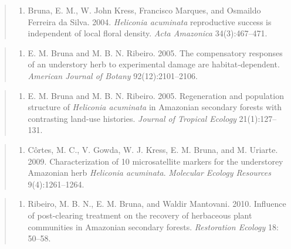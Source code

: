 \documentclass[
  12pt,
  man, donotrepeattitle,floatsintext]{apa6}
\providecommand{\tightlist}{%
  \setlength{\itemsep}{0pt}\setlength{\parskip}{0pt}}
\begin{document}
\begin{quote}
\begin{enumerate}
\def\labelenumi{\arabic{enumi}.}
\setcounter{enumi}{1}
\tightlist
\item
  Bruna, E. M., W. John Kress, Francisco Marques, and Osmaildo Ferreira da Silva. 2004. \emph{Heliconia acuminata} reproductive success is independent of local floral density. \emph{Acta Amazonica} 34(3):467--471.
\end{enumerate}
\end{quote}

\begin{quote}
\begin{enumerate}
\def\labelenumi{\arabic{enumi}.}
\setcounter{enumi}{2}
\tightlist
\item
  E. M. Bruna and M. B. N. Ribeiro. 2005. The compensatory responses of an understory herb to experimental damage are habitat‐dependent. \emph{American Journal of Botany} 92(12):2101--2106.
\end{enumerate}
\end{quote}

\begin{quote}
\begin{enumerate}
\def\labelenumi{\arabic{enumi}.}
\setcounter{enumi}{3}
\tightlist
\item
  E. M. Bruna and M. B. N. Ribeiro. 2005. Regeneration and population structure of \emph{Heliconia acuminata} in Amazonian secondary forests with contrasting land-use histories. \emph{Journal of Tropical Ecology} 21(1):127--131.
\end{enumerate}
\end{quote}

\begin{quote}
\begin{enumerate}
\def\labelenumi{\arabic{enumi}.}
\setcounter{enumi}{4}
\tightlist
\item
  Côrtes, M. C., V. Gowda, W. J. Kress, E. M. Bruna, and M. Uriarte. 2009. Characterization of 10 microsatellite markers for the understorey Amazonian herb \emph{Heliconia acuminata}. \emph{Molecular Ecology Resources} 9(4):1261--1264.
\end{enumerate}
\end{quote}

\begin{quote}
\begin{enumerate}
\def\labelenumi{\arabic{enumi}.}
\setcounter{enumi}{5}
\tightlist
\item
  Ribeiro, M. B. N., E. M. Bruna, and Waldir Mantovani. 2010. Influence of post-clearing treatment on the recovery of herbaceous plant communities in Amazonian secondary forests. \emph{Restoration Ecology} 18: 50--58.
\end{enumerate}
\end{quote}
\end{document}
